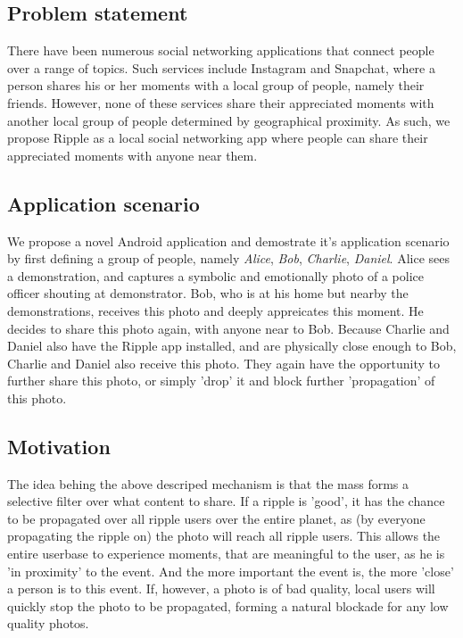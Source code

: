 \documentclass{report}
\begin{document}
\subsection{Problem statement}
There have been numerous social networking applications that connect people over a range of topics. Such services include Instagram and Snapchat, where a person shares his or her moments with a local group of people, namely their friends. However, none of these services share their appreciated moments with another local group of people determined by geographical proximity. As such, we propose Ripple as a local social networking app where people can share their appreciated moments with anyone near them.

\subsection{Application scenario}
We propose a novel Android application and demostrate it's application scenario by first defining a group of people, namely \textit{Alice}, \textit{Bob}, \textit{Charlie}, \textit{Daniel}.
Alice sees a demonstration, and captures a symbolic and emotionally photo of a police officer shouting at demonstrator. Bob, who is at his home but nearby the demonstrations,  receives this photo and deeply appreicates this moment. He decides to share this photo again, with anyone near to Bob. Because Charlie and Daniel also have the Ripple app installed, and are physically close enough to Bob, Charlie and Daniel also receive this photo. They again have the opportunity to further share this photo, or simply 'drop' it and block further 'propagation' of this photo.

\subsection{Motivation}
The idea behing the above descriped mechanism is that the mass forms a selective filter over what content to share. If a ripple is 'good', it has the chance to be propagated over all ripple users over the entire planet, as (by everyone propagating the ripple on) the photo will reach all ripple users. This allows the entire userbase to experience moments, that are meaningful to the user, as he is 'in proximity' to the event. And the more important the event is, the more 'close' a person is to this event. If, however, a photo is of bad quality, local users will quickly stop the photo to be propagated, forming a natural blockade for any low quality photos.
\end{document}

